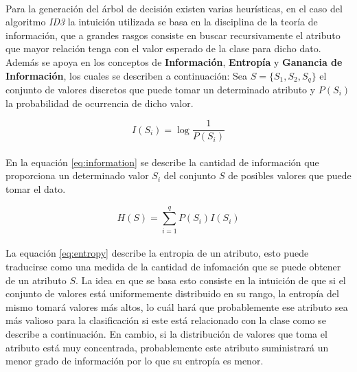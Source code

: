 \documentclass[10pt, a4paper,spanish]{article}
\begin{document}
		\paragraph{}
		Para la generación del árbol de decisión existen varias heurísticas, en el caso del algoritmo \emph{ID3} la intuición utilizada se basa en la disciplina de la teoría de información, que a grandes rasgos consiste en buscar recursivamente el atributo que mayor relación tenga con el valor esperado de la clase para dicho dato. Además se apoya en los conceptos de \textbf{Información}, \textbf{Entropía} y \textbf{Ganancia de Información}, los cuales se describen a continuación: Sea $S = \{ S_1, S_2, S_q \}$ el conjunto de valores discretos que puede tomar un determinado atributo y $P(S_i)$ la probabilidad de ocurrencia de dicho valor.

		\begin{equation}
			\label{eq:information}
			I(S_i) = \log \frac{1}{P(S_i)}
		\end{equation}

		\paragraph{}
		En la equación \eqref{eq:information} se describe la cantidad de información que proporciona un determinado valor $S_i$ del conjunto $S$ de posibles valores que puede tomar el dato.

		\begin{equation}
			\label{eq:entropy}
			H(S) = \sum_{i=1}^q P(S_i)I(S_i)
		\end{equation}

		\paragraph{}
		La equación \eqref{eq:entropy} describe la entropia de un atributo, esto puede traducirse como una medida de la cantidad de infomación que se puede obtener de un atributo $S$. La idea en que se basa esto consiste en la intuición de que si el conjunto de valores está uniformemente distribuido en su rango, la entropía del mismo tomará valores más altos, lo cuál hará que probablemente ese atributo sea más valioso para la clasificación si este está relacionado con la clase como se describe a continuación. En cambio, si la distribución de valores que toma el atributo está muy concentrada, probablemente este atributo suministrará un menor grado de información por lo que su entropía es menor.
\end{document}
